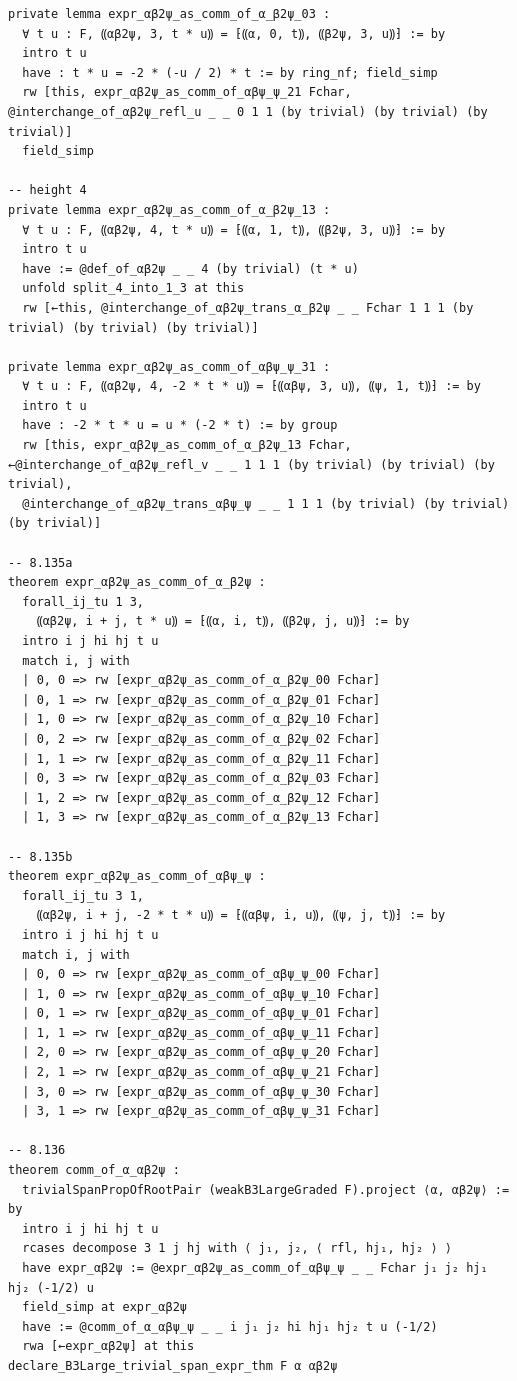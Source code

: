 \begin{Verbatim}
private lemma expr_αβ2ψ_as_comm_of_α_β2ψ_03 :
  ∀ t u : F, ⸨αβ2ψ, 3, t * u⸩ = ⁅⸨α, 0, t⸩, ⸨β2ψ, 3, u⸩⁆ := by
  intro t u
  have : t * u = -2 * (-u / 2) * t := by ring_nf; field_simp
  rw [this, expr_αβ2ψ_as_comm_of_αβψ_ψ_21 Fchar, @interchange_of_αβ2ψ_refl_u _ _ 0 1 1 (by trivial) (by trivial) (by trivial)]
  field_simp

-- height 4
private lemma expr_αβ2ψ_as_comm_of_α_β2ψ_13 :
  ∀ t u : F, ⸨αβ2ψ, 4, t * u⸩ = ⁅⸨α, 1, t⸩, ⸨β2ψ, 3, u⸩⁆ := by
  intro t u
  have := @def_of_αβ2ψ _ _ 4 (by trivial) (t * u)
  unfold split_4_into_1_3 at this
  rw [←this, @interchange_of_αβ2ψ_trans_α_β2ψ _ _ Fchar 1 1 1 (by trivial) (by trivial) (by trivial)]

private lemma expr_αβ2ψ_as_comm_of_αβψ_ψ_31 :
  ∀ t u : F, ⸨αβ2ψ, 4, -2 * t * u⸩ = ⁅⸨αβψ, 3, u⸩, ⸨ψ, 1, t⸩⁆ := by
  intro t u
  have : -2 * t * u = u * (-2 * t) := by group
  rw [this, expr_αβ2ψ_as_comm_of_α_β2ψ_13 Fchar, ←@interchange_of_αβ2ψ_refl_v _ _ 1 1 1 (by trivial) (by trivial) (by trivial),
  @interchange_of_αβ2ψ_trans_αβψ_ψ _ _ 1 1 1 (by trivial) (by trivial) (by trivial)]

-- 8.135a
theorem expr_αβ2ψ_as_comm_of_α_β2ψ :
  forall_ij_tu 1 3,
    ⸨αβ2ψ, i + j, t * u⸩ = ⁅⸨α, i, t⸩, ⸨β2ψ, j, u⸩⁆ := by
  intro i j hi hj t u
  match i, j with
  | 0, 0 => rw [expr_αβ2ψ_as_comm_of_α_β2ψ_00 Fchar]
  | 0, 1 => rw [expr_αβ2ψ_as_comm_of_α_β2ψ_01 Fchar]
  | 1, 0 => rw [expr_αβ2ψ_as_comm_of_α_β2ψ_10 Fchar]
  | 0, 2 => rw [expr_αβ2ψ_as_comm_of_α_β2ψ_02 Fchar]
  | 1, 1 => rw [expr_αβ2ψ_as_comm_of_α_β2ψ_11 Fchar]
  | 0, 3 => rw [expr_αβ2ψ_as_comm_of_α_β2ψ_03 Fchar]
  | 1, 2 => rw [expr_αβ2ψ_as_comm_of_α_β2ψ_12 Fchar]
  | 1, 3 => rw [expr_αβ2ψ_as_comm_of_α_β2ψ_13 Fchar]

-- 8.135b
theorem expr_αβ2ψ_as_comm_of_αβψ_ψ :
  forall_ij_tu 3 1,
    ⸨αβ2ψ, i + j, -2 * t * u⸩ = ⁅⸨αβψ, i, u⸩, ⸨ψ, j, t⸩⁆ := by
  intro i j hi hj t u
  match i, j with
  | 0, 0 => rw [expr_αβ2ψ_as_comm_of_αβψ_ψ_00 Fchar]
  | 1, 0 => rw [expr_αβ2ψ_as_comm_of_αβψ_ψ_10 Fchar]
  | 0, 1 => rw [expr_αβ2ψ_as_comm_of_αβψ_ψ_01 Fchar]
  | 1, 1 => rw [expr_αβ2ψ_as_comm_of_αβψ_ψ_11 Fchar]
  | 2, 0 => rw [expr_αβ2ψ_as_comm_of_αβψ_ψ_20 Fchar]
  | 2, 1 => rw [expr_αβ2ψ_as_comm_of_αβψ_ψ_21 Fchar]
  | 3, 0 => rw [expr_αβ2ψ_as_comm_of_αβψ_ψ_30 Fchar]
  | 3, 1 => rw [expr_αβ2ψ_as_comm_of_αβψ_ψ_31 Fchar]

-- 8.136
theorem comm_of_α_αβ2ψ :
  trivialSpanPropOfRootPair (weakB3LargeGraded F).project ⟨α, αβ2ψ⟩ := by
  intro i j hi hj t u
  rcases decompose 3 1 j hj with ⟨ j₁, j₂, ⟨ rfl, hj₁, hj₂ ⟩ ⟩
  have expr_αβ2ψ := @expr_αβ2ψ_as_comm_of_αβψ_ψ _ _ Fchar j₁ j₂ hj₁ hj₂ (-1/2) u
  field_simp at expr_αβ2ψ
  have := @comm_of_α_αβψ_ψ _ _ i j₁ j₂ hi hj₁ hj₂ t u (-1/2)
  rwa [←expr_αβ2ψ] at this
declare_B3Large_trivial_span_expr_thm F α αβ2ψ


\end{Verbatim}
